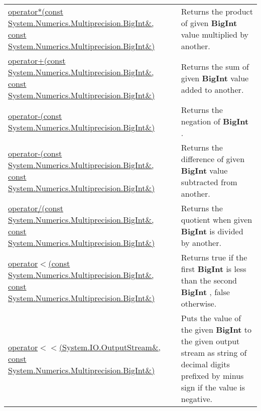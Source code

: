 \documentclass[a4paper,oneside,11.000000pt]{book}
\begin{document}
\begin{flushleft}
\begin{supertabular}[l]{!{\raggedright}p{7.575cm}!{\raggedright}p{7.575cm}}
\\
\hyperlink{System.Numerics.Multiprecision.operator.times.C.R.System.Numerics.Multiprecision.BigInt.C.R.System.Numerics.Multiprecision.BigInt}{operator*(const System.\-Numerics.\-Multiprecision.\-BigInt\&\-, const System.\-Numerics.\-Multiprecision.\-BigInt\&\-)}
& Returns the product of given \textbf{BigInt}
 value multiplied by another.

\\
\hyperlink{System.Numerics.Multiprecision.operator.plus.C.R.System.Numerics.Multiprecision.BigInt.C.R.System.Numerics.Multiprecision.BigInt}{operator+(const System.\-Numerics.\-Multiprecision.\-BigInt\&\-, const System.\-Numerics.\-Multiprecision.\-BigInt\&\-)}
& Returns the sum of given \textbf{BigInt}
 value added to another.

\\
\hyperlink{System.Numerics.Multiprecision.operator.minus.C.R.System.Numerics.Multiprecision.BigInt}{operator-(const System.\-Numerics.\-Multiprecision.\-BigInt\&\-)}
& Returns the negation of \textbf{BigInt}
.

\\
\hyperlink{System.Numerics.Multiprecision.operator.minus.C.R.System.Numerics.Multiprecision.BigInt.C.R.System.Numerics.Multiprecision.BigInt}{operator-(const System.\-Numerics.\-Multiprecision.\-BigInt\&\-, const System.\-Numerics.\-Multiprecision.\-BigInt\&\-)}
& Returns the difference of given \textbf{BigInt}
 value subtracted from another.

\\
\hyperlink{System.Numerics.Multiprecision.operator.divides.C.R.System.Numerics.Multiprecision.BigInt.C.R.System.Numerics.Multiprecision.BigInt}{operator/(const System.\-Numerics.\-Multiprecision.\-BigInt\&\-, const System.\-Numerics.\-Multiprecision.\-BigInt\&\-)}
& Returns the quotient when given \textbf{BigInt}
 is divided by another.

\\
\hyperlink{System.Numerics.Multiprecision.operator.less.C.R.System.Numerics.Multiprecision.BigInt.C.R.System.Numerics.Multiprecision.BigInt}{operator$<$\-(const System.\-Numerics.\-Multiprecision.\-BigInt\&\-, const System.\-Numerics.\-Multiprecision.\-BigInt\&\-)}
& Returns true if the first \textbf{BigInt}
 is less than the second \textbf{BigInt}
, false otherwise.

\\
\hyperlink{System.Numerics.Multiprecision.operator.shiftLeft.R.System.IO.OutputStream.C.R.System.Numerics.Multiprecision.BigInt}{operator$<$\-$<$\-(System.\-IO.\-OutputStream\&\-, const System.\-Numerics.\-Multiprecision.\-BigInt\&\-)}
& Puts the value of the given \textbf{BigInt}
 to the given output stream as string of decimal digits prefixed by minus sign if the value is negative.


\end{supertabular}
\end{flushleft}
\end{document}
